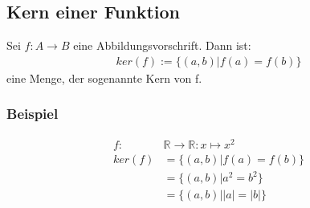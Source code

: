 \subsection{Kern einer Funktion}
Sei $f:{A}\longrightarrow{B}$ eine Abbildungsvorschrift.
Dann ist:
\begin{align*}
   ker(f) := \{(a,b) | f(a)=f(b)\}
\end{align*}
eine Menge, der sogenannte Kern von f.
\subsubsection{Beispiel}
\begin{align*}
  f: &\mathbb{R} \rightarrow \mathbb{R} : {x}\longmapsto{x^2} \\
  ker(f) &= \{(a,b) | f(a)=f(b) \} \\
         &= \{ (a,b) | a^2 = b^2 \} \\
         &= \{ (a,b) | |a| =|b| \}
\end{align*}

